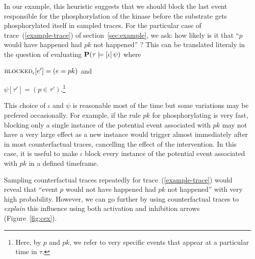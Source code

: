 In our example, this heuristic suggests that we should block the last
event responsible for the phosphorylation of the kinase before the
substrate gets phosphorylated itself in sampled traces. For the
particular case of trace~(\ref{example-trace}) of
section~\ref{sec:example}, we ask: how likely is it that ``$p$ would
have happened had $pk$ not happened'' ?  This can be translated
literaly in the question of evaluating $\mathbf{P}(\tau \models [\iota] \, \psi{})$ where
\begin{inparaenum}[(i)]
\item ${\textsc{blocked}}_{\iota}[e'] = (e = pk)$ and
\item $\psi[\tau'] = (p \in \tau')$.\footnote{Here, by $p$ and $pk$,
    we refer to very specific events that appear at a particular time
    in $\tau$.}
\end{inparaenum}
This choice of $\iota$ and $\psi$ is reasonable most of the
time but some variations may be prefered occasionally. For example, if
the rule $pk$ for phosphorylating is very fast, blocking only a single
instance of the potential event associated with $pk$ may not have a
very large effect as a new instance would trigger almost immediately
after in most counterfactual traces, cancelling the effect of the
intervention.  In this case, it is useful to make $\iota$ block every
instance of the potential event associated with $pk$ in a defined
timeframe.

Sampling counterfactual traces repeatedly for
trace~(\ref{example-trace}) would reveal that ``event $p$ would not
have happened had $pk$ not happened'' with very high probability.
However, we can go further by using counterfactual traces to
\textit{explain} this influence using both activation and inhibition
arrows (Figure~\ref{fig:cex}).